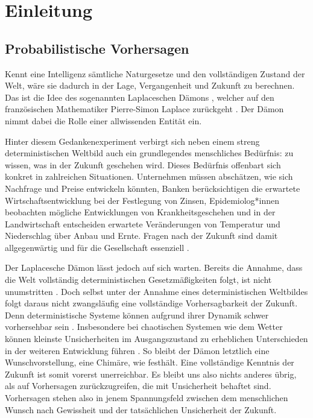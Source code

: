\chapter{Einleitung}

\section{Probabilistische Vorhersagen}
\raggedbottom
\glqq Kennt eine Intelligenz sämtliche Naturgesetze und den vollständigen Zustand der Welt, wäre sie dadurch in der Lage, Vergangenheit und Zukunft zu berechnen\grqq{}. Das ist die Idee des sogenannten \glqq Laplaceschen Dämons\grqq{} \parencite{deamon-out}, welcher auf den französischen Mathematiker Pierre-Simon Laplace zurückgeht \parencite{laplace1814essai}. Der Dämon nimmt dabei die Rolle einer allwissenden Entität ein. 

Hinter diesem Gedankenexperiment verbirgt sich neben einem streng deterministischen Weltbild auch ein grundlegendes menschliches Bedürfnis: zu wissen, was in der Zukunft geschehen wird. Dieses Bedürfnis offenbart sich konkret in zahlreichen Situationen. Unternehmen müssen abschätzen, wie sich Nachfrage und Preise entwickeln könnten, Banken berücksichtigen die erwartete Wirtschaftsentwicklung bei der Festlegung von Zinsen, Epidemiolog*innen beobachten mögliche Entwicklungen von Krankheitsgeschehen und in der Landwirtschaft entscheiden erwartete Veränderungen von Temperatur und Niederschlag über Anbau und Ernte. Fragen nach der Zukunft sind damit allgegenwärtig und für die Gesellschaft essenziell \parencite{prediction}.

Der Laplacesche Dämon lässt jedoch auf sich warten. Bereits die Annahme, dass die Welt vollständig deterministischen Gesetzmäßigkeiten folgt, ist nicht unumstritten \parencite{determinism}. Doch selbst unter der Annahme eines deterministischen Weltbildes folgt daraus nicht zwangsläufig eine vollständige Vorhersagbarkeit der Zukunft. Denn deterministische Systeme können aufgrund ihrer Dynamik schwer vorhersehbar sein \parencite{Shermer1995}. Insbesondere bei chaotischen Systemen wie dem Wetter können kleinste Unsicherheiten im Ausgangszustand zu erheblichen Unterschieden in der weiteren Entwicklung führen \parencite{dwd_ensemble_vorhersage}. So bleibt der Dämon letztlich eine Wunschvorstellung, eine Chimäre, wie \textcite{Shermer1995} festhält. Eine vollständige Kenntnis der Zukunft ist somit vorerst unerreichbar. Es bleibt uns also nichts anderes übrig, als auf Vorhersagen zurückzugreifen, die mit Unsicherheit behaftet sind. Vorhersagen stehen also in jenem Spannungsfeld zwischen dem menschlichen Wunsch nach Gewissheit und der tatsächlichen Unsicherheit der Zukunft.

